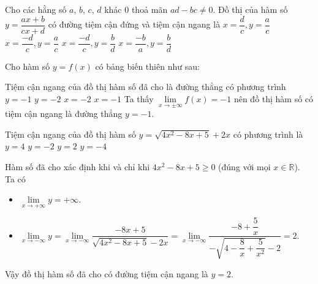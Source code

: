 \begin{ex}%
	Cho các hằng số $a$, $b$, $c$, $d$ khác $0$ thoả mãn $a d-b c \neq 0$. Đồ thị của hàm số $y=\dfrac{a x+b}{c x+d}$ có đường tiệm cận đứng và tiệm cận ngang là
	\choice
	{$x=\dfrac{d}{c}, y=\dfrac{a}{c}$}
	{\True $x=\dfrac{-d}{c}, y=\dfrac{a}{c}$}
	{$x=\dfrac{-d}{c}, y=\dfrac{b}{d}$}
	{$x=\dfrac{-b}{a}, y=\dfrac{b}{d}$}
\end{ex}

\begin{ex}%
	Cho hàm số $ y=f(x) $ có bảng biến thiên như sau:
	\begin{center}
	\end{center}
	Tiệm cận ngang của đồ thị hàm số đã cho là đường thẳng  có phương trình
	\choice
	{\True $ y=-1 $}
	{$ y=-2 $}
	{$ x=-2 $}
	{$ x=-1 $}
	\loigiai
	{
		Ta thấy $ \lim \limits_{x \to \pm \infty} f(x) =-1$ nên đồ thị hàm số có tiệm cận ngang là đường thẳng $ y=-1 $.
	}
\end{ex}

\begin{ex}%
	Tiệm cận ngang của đồ thị hàm số $y = \sqrt{4x^2-8x+5} + 2x$ có phương trình là
	\choice
	{$y=4$}
	{$y=-2$}
	{\True $y=2$}
	{$y=-4$}
	\loigiai
	{
		Hàm số đã cho xác định khi và chỉ khi $4x^2-8x+5\ge0$ (đúng với mọi $x\in\mathbb{R}$).\\
		Ta có
		\begin{itemize}
			\item $\lim\limits_{x\to+\infty}y=+\infty$.
			\item $\lim\limits_{x\to-\infty}y=\lim\limits_{x\to-\infty}\dfrac{-8x+5}{\sqrt{4x^2-8x+5}-2x}=\lim\limits_{x\to-\infty}\dfrac{-8+\dfrac{5}{x}}{-\sqrt{4-\dfrac{8}{x}+\dfrac{5}{x^2}}-2}=2$.
		\end{itemize}
		Vậy đồ thị hàm số đã cho có đường tiệm cận ngang là $y=2$.
	}
\end{ex}

